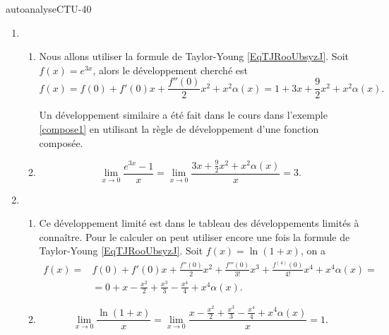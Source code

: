 
\begin{corrige}{autoanalyseCTU-40}

\begin{enumerate}
\item \begin{enumerate}
\item Nous allons utiliser la formule de Taylor-Young \eqref{EqTJRooUbsyzJ}. Soit $f(x) = e^{3x}$, alors le développement cherché est 
\[
f(x) = f(0) + f'(0)x + \frac{f''(0)}{2}x^2 + x^2\alpha(x) = 1 + 3x +\frac{9}{2}x^2 +  x^2\alpha(x).
\]
\begin{remark}
  Un développement similaire a été fait dans le cours dans l'exemple \ref{compose1} en utilisant la règle de développement d'une fonction composée. 
\end{remark}
\item \[\lim_{x\to 0}\dfrac{e^{3x}-1}{x} = \lim_{x\to 0}\frac{3x +\frac{9}{2}x^2 +  x^2\alpha(x)}{x} =3.\]
\end{enumerate}
\item \begin{enumerate}
\item Ce développement limité est dans le tableau des développements limités à conna\^{i}tre. Pour le calculer on peut utiliser encore une fois la formule de Taylor-Young \eqref{EqTJRooUbsyzJ}. Soit $f(x) = \ln(1+x)$, on a
  \begin{equation*}
    \begin{aligned}
      f(x) =& f(0) + f'(0)x + \frac{f''(0)}{2}x^2 + \frac{f'''(0)}{3!} x^3 + \frac{f^{(4)}(0)}{4!} x^4 + x^4 \alpha(x)=\\
      & = 0 + x -\frac{x^2}{2} + \frac{x^3}{3} -\frac{x^4}{4} + x^4 \alpha(x).
    \end{aligned}
  \end{equation*}
\item  \[\lim_{x\to0}\frac{\ln (1+x)}{x} = \lim_{x\to0}\frac{x -\frac{x^2}{2} + \frac{x^3}{3} -\frac{x^4}{4} + x^4 \alpha(x)}{x} = 1.\]

\end{enumerate}
\end{enumerate}

\end{corrige}   
